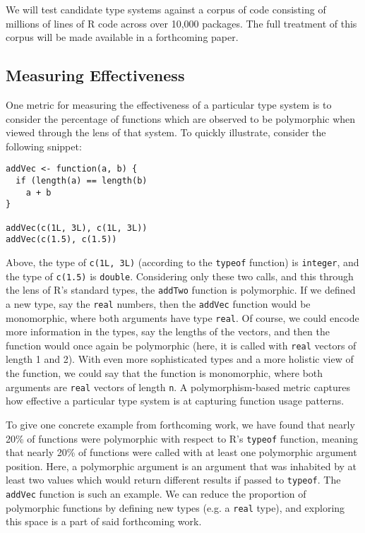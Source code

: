 \documentclass[sigplan,10pt,review]{acmart}\settopmatter{printfolios=true,printccs=false,printacmref=false}
\begin{document}
We will test candidate type systems against a corpus of code consisting of millions of lines of R code across over 10,000 packages.
The full treatment of this corpus will be made available in a forthcoming paper.

%
%
\subsection{Measuring Effectiveness}

One metric for measuring the effectiveness of a particular type system is to consider the percentage of functions which are observed to be polymorphic when viewed through the lens of that system. 
To quickly illustrate, consider the following snippet:

\begin{lstlisting}
addVec <- function(a, b) {
  if (length(a) == length(b)
    a + b
}

addVec(c(1L, 3L), c(1L, 3L))
addVec(c(1.5), c(1.5))
\end{lstlisting}

Above, the type of {\tt c(1L, 3L)} (according to the {\tt typeof} function) is {\tt integer}, and the type of {\tt c(1.5)} is {\tt double}.
Considering only these two calls, and this through the lens of R's standard types, the {\tt addTwo} function is polymorphic.
If we defined a new type, say the {\tt real} numbers, then the {\tt addVec} function would be monomorphic, where both arguments have type {\tt real}.
Of course, we could encode more information in the types, say the lengths of the vectors, and then the function would once again be polymorphic (here, it is called with {\tt real} vectors of length 1 and 2).
With even more sophisticated types and a more holistic view of the function, we could say that the function is monomorphic, where both arguments are {\tt real} vectors of length {\tt n}.
A polymorphism-based metric captures how effective a particular type system is at capturing function usage patterns.

To give one concrete example from forthcoming work, we have found that nearly 20\% of functions were polymorphic with respect to R's {\tt typeof} function, meaning that nearly 20\% of functions were called with at least one polymorphic argument position.
Here, a polymorphic argument is an argument that was inhabited by at least two values which would return different results if passed to {\tt typeof}.
The {\tt addVec} function is such an example.
We can reduce the proportion of polymorphic functions by defining new types (e.g. a {\tt real} type), and exploring this space is a part of said forthcoming work.
\end{document}
